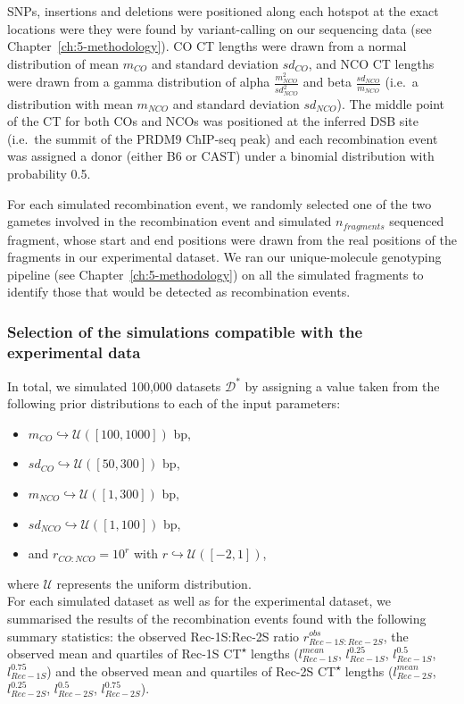 SNPs, insertions and deletions were positioned along each hotspot at the exact locations were they were found by variant-calling on our sequencing data (see Chapter~\ref{ch:5-methodology}). 
CO CT lengths were drawn from a normal distribution of mean $m_{CO}$ and standard deviation $sd_{CO}$, and NCO CT lengths were drawn from a gamma distribution of alpha $\frac{m_{NCO}^{2}}{sd_{NCO}^{2}}$ and beta $\frac{sd_{NCO}}{m_{NCO}}$ (i.e.\ a distribution with mean $m_{NCO}$ and standard deviation $sd_{NCO}$). 
The middle point of the CT for both COs and NCOs was positioned at the inferred DSB site (i.e.\ the summit of the PRDM9 ChIP-seq peak) and each recombination event was assigned a donor (either B6 or CAST) under a binomial distribution with probability 0.5.

For each simulated recombination event, we randomly selected one of the two gametes involved in the recombination event and simulated $n_{fragments}$ sequenced fragment, whose start and end positions were drawn from the real positions of the fragments in our experimental dataset. 
We ran our unique-molecule genotyping pipeline (see Chapter~\ref{ch:5-methodology}) on all the simulated fragments to identify those that would be detected as recombination events.



\subsubsection{Selection of the simulations compatible with the experimental data}
In total, we simulated 100,000 datasets $\mathcal{D^{*}}$ by assigning a value taken from the following prior distributions to each of the input parameters: 
\begin{itemize}
    \item $m_{CO} \hookrightarrow \mathcal{U}([100, 1000])$ bp, 
    \item $sd_{CO} \hookrightarrow \mathcal{U}([50, 300])$ bp,
    \item $m_{NCO} \hookrightarrow \mathcal{U}([1, 300])$ bp, 
    \item $sd_{NCO} \hookrightarrow \mathcal{U}([1, 100])$ bp,
    \item and $r_{CO:NCO} = 10^{r}$ with $r \hookrightarrow \mathcal{U}([-2, 1])$,
\end{itemize}
where $\mathcal{U}$ represents the uniform distribution.\\

For each simulated dataset as well as for the experimental dataset, we summarised the results of the recombination events found with the following summary statistics: the observed Rec-1S:Rec-2S ratio $r_{Rec-1S:Rec-2S}^{obs}$, the observed mean and quartiles of Rec-1S CT\textsuperscript{$\star$} lengths ($l_{Rec-1S}^{mean}$, $l_{Rec-1S}^{0.25}$, $l_{Rec-1S}^{0.5}$, $l_{Rec-1S}^{0.75}$) and the observed mean and quartiles of Rec-2S CT\textsuperscript{$\star$} lengths ($l_{Rec-2S}^{mean}$, $l_{Rec-2S}^{0.25}$, $l_{Rec-2S}^{0.5}$, $l_{Rec-2S}^{0.75}$). 

